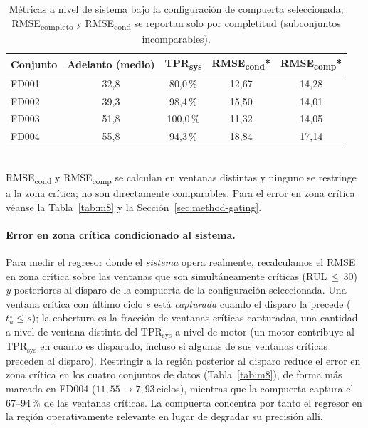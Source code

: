 \documentclass[5p,times,authoryear]{elsarticle}
\begin{document}
\begin{table}[!t]
\centering
\caption{Métricas a nivel de sistema bajo la configuración de compuerta seleccionada; RMSE\textsubscript{completo} y RMSE\textsubscript{cond} se reportan solo por completitud (subconjuntos incomparables).}
\label{tab:gating-system}
\small
\begin{tabular}{lcccc}
\toprule
Conjunto & Adelanto (medio) & TPR\textsubscript{sys} & RMSE\textsubscript{cond}* & RMSE\textsubscript{comp}* \\
\midrule
FD001 & 32,8 & 80,0\,\%  & 12,67 & 14,28 \\
FD002 & 39,3 & 98,4\,\%  & 15,50 & 14,01 \\
FD003 & 51,8 & 100,0\,\% & 11,32 & 14,05 \\
FD004 & 55,8 & 94,3\,\%  & 18,84 & 17,14 \\
\bottomrule
\end{tabular}
\\[2pt]
\footnotesize *RMSE\textsubscript{cond} y RMSE\textsubscript{comp} se calculan en ventanas distintas y ninguno se restringe a la zona crítica; no son directamente comparables. Para el error en zona crítica véanse la Tabla~\ref{tab:m8} y la Sección~\ref{sec:method-gating}.
\end{table}

\paragraph{Error en zona crítica condicionado al sistema.} Para medir el regresor donde el \emph{sistema} opera realmente, recalculamos el RMSE en zona crítica sobre las ventanas que son simultáneamente críticas (RUL\,$\le$\,30) \emph{y} posteriores al disparo de la compuerta de la configuración seleccionada. Una ventana crítica con último ciclo $s$ está \emph{capturada} cuando el disparo la precede ($t^\star_u\le s$); la cobertura es la fracción de ventanas críticas capturadas, una cantidad a nivel de ventana distinta del $\mathrm{TPR}_{\mathrm{sys}}$ a nivel de motor (un motor contribuye al $\mathrm{TPR}_{\mathrm{sys}}$ en cuanto es disparado, incluso si algunas de sus ventanas críticas preceden al disparo). Restringir a la región posterior al disparo reduce el error en zona crítica en los cuatro conjuntos de datos (Tabla~\ref{tab:m8}), de forma más marcada en FD004 ($11{,}55\rightarrow 7{,}93$\,ciclos), mientras que la compuerta captura el 67--94\,\% de las ventanas críticas. La compuerta concentra por tanto el regresor en la región operativamente relevante en lugar de degradar su precisión allí.
\end{document}

